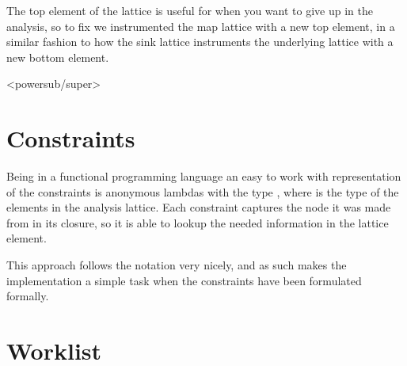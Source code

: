 The top element of the lattice is useful for when you want to give up in the analysis, so to fix we instrumented the map lattice with a new top element, in a similar fashion to how the sink lattice instruments the underlying lattice with a new bottom element. 

<powersub/super>


\section{Constraints}

Being in a functional programming language an easy to work with representation of the constraints is anonymous lambdas with the type , where  is the type of the elements in the analysis lattice. Each constraint captures the node it was made from in its closure, so it is able to lookup the needed information in the lattice element.

This approach follows the notation very nicely, and as such makes the implementation a simple task when the constraints have been formulated formally.


\section{Worklist}
